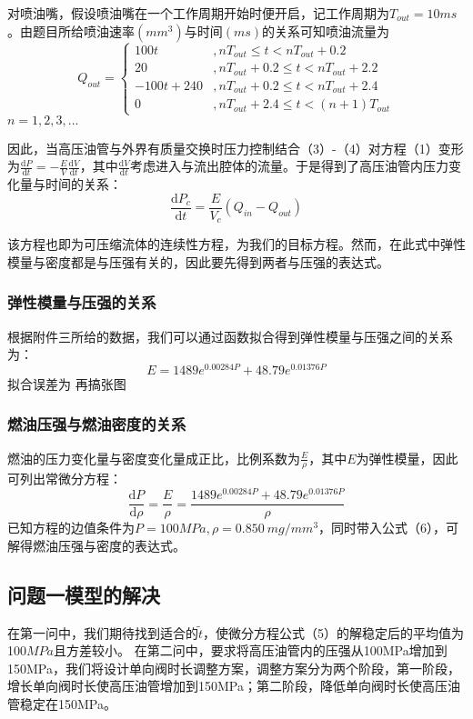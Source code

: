\documentclass[withoutpreface,bwprint]{cumcmthesis} %
\begin{document}
	对喷油嘴，假设喷油嘴在一个工作周期开始时便开启，记工作周期为$T_{out} = 10 ms$。由题目所给喷油速率$(mm^3)$与时间$(ms)$的关系可知喷油流量为
	\begin{equation}
	Q_{out} = \left\{ 
	\begin{array}{ll}
	100t&,nT_{out}\leq t<nT_{out}+0.2 \\
	20&,nT_{out}+0.2\leq t< nT_{out}+2.2\\
	-100t+240&,nT_{out}+0.2\leq t< nT_{out}+2.4\\
	0&,nT_{out}+2.4\leq t <(n+1)T_{out}
	\end{array}
	\right.
	\end{equation}
	$n = 1,2,3,...$
	
	因此，当高压油管与外界有质量交换时压力控制结合（3）-（4）对方程（1）变形为$\frac{\mathrm{d}P}{\mathrm{d}t}=-\frac{E}{V}\frac{\mathrm{d}V}{\mathrm{d}t}$，其中$\frac{\mathrm{d}V}{\mathrm{d}t}$考虑进入与流出腔体的流量。于是得到了高压油管内压力变化量与时间的关系：
			\begin{equation}
			\frac{\mathrm{d}P_c}{\mathrm{d}t} = \frac{E}{V_c}(Q_{in} - Q_{out})
			\end{equation}
			
			该方程也即为可压缩流体的连续性方程，为我们的目标方程。然而，在此式中弹性模量与密度都是与压强有关的，因此要先得到两者与压强的表达式。
			\subsubsection{弹性模量与压强的关系}
			根据附件三所给的数据，我们可以通过函数拟合得到弹性模量与压强之间的关系为：
			\begin{equation}
			E = 1489 e^{0.00284P} + 48.79 e^{0.01376 P}
			\end{equation}
			拟合误差为 再搞张图
			
			
			\subsubsection{燃油压强与燃油密度的关系}
			燃油的压力变化量与密度变化量成正比，比例系数为$\frac{E}{\rho}$，其中$E$为弹性模量，因此可列出常微分方程：
			\begin{equation}
			\frac{\mathrm{d}P}{\mathrm{d}\rho} = \frac{E}{\rho} = \frac{1489 e^{0.00284P} + 48.79 e^{0.01376 P}}{\rho}
			\end{equation}
			已知方程的边值条件为$P = 100MPa, \rho = 0.850\ mg/mm^3$，同时带入公式（6），可解得燃油压强与密度的表达式。
			\subsection{问题一模型的解决}
			在第一问中，我们期待找到适合的$\widetilde{t}$，使微分方程公式（5）的解稳定后的平均值为100$MPa$且方差较小。
			在第二问中，要求将高压油管内的压强从100MPa增加到150MPa，我们将设计单向阀时长调整方案，调整方案分为两个阶段，第一阶段，增长单向阀时长使高压油管增加到150MPa；第二阶段，降低单向阀时长使高压油管稳定在150MPa。
\end{document}

